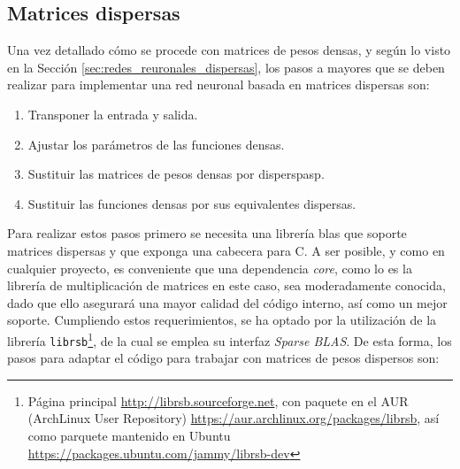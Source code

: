 \subsection{Matrices dispersas}
\label{ssec_gdin_matrices_dispersas}
Una vez detallado cómo se procede con matrices de pesos densas, y según lo visto en la Sección \ref{sec:redes_reuronales_dispersas}, los pasos a mayores que se deben realizar para implementar una red neuronal basada en matrices dispersas son:

\begin{enumerate}
    \item Transponer la entrada y salida.
    \item Ajustar los parámetros de las funciones densas.
    \item Sustituir las matrices de pesos densas por disperspasp.
    \item Sustituir las funciones densas por sus equivalentes dispersas.
\end{enumerate}

Para realizar estos pasos primero se necesita una librería \acrshort{blas} que soporte matrices dispersas y que exponga una cabecera para C. A ser posible, y como en cualquier proyecto, es conveniente que una dependencia \textit{core}, como lo es la librería de multiplicación de matrices en este caso, sea moderadamente conocida, dado que ello asegurará una mayor calidad del código interno, así como un mejor soporte. Cumpliendo estos requerimientos, se ha optado por la utilización de la librería \texttt{librsb}\footnote{Página principal \url{http://librsb.sourceforge.net}, con paquete en el AUR (ArchLinux User Repository) \url{https://aur.archlinux.org/packages/librsb}, así como parquete mantenido en Ubuntu \url{https://packages.ubuntu.com/jammy/librsb-dev}}, de la cual se emplea su interfaz \textit{Sparse BLAS}. De esta forma, los pasos para adaptar el código para trabajar con matrices de pesos dispersos son:

